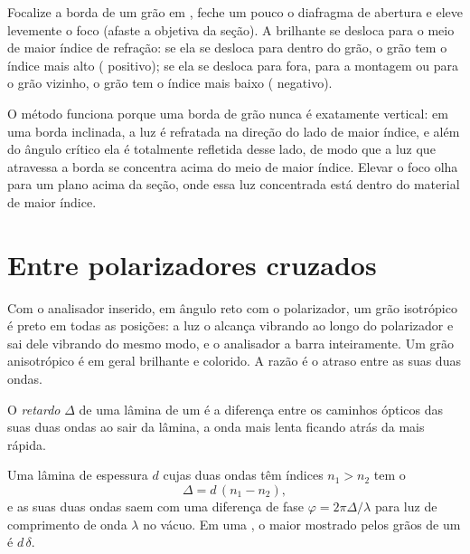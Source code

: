 \begin{method}\label{met:b1:optical-mineralogy:becke}
Focalize a borda de um grão em , feche um pouco o diafragma de abertura e eleve levemente o foco (afaste a objetiva da seção). A  brilhante se desloca para o meio de maior índice de refração: se ela se desloca para dentro do grão, o grão tem o índice mais alto ( positivo); se ela se desloca para fora, para a montagem ou para o grão vizinho, o grão tem o índice mais baixo ( negativo).
\end{method}

O método funciona porque uma borda de grão nunca é exatamente vertical: em uma borda inclinada, a luz é refratada na direção do lado de maior índice, e além do ângulo crítico ela é totalmente refletida desse lado, de modo que a luz que atravessa a borda se concentra acima do meio de maior índice. Elevar o foco olha para um plano acima da seção, onde essa luz concentrada está dentro do material de maior índice.

\section{Entre polarizadores cruzados}

Com o analisador inserido, em ângulo reto com o polarizador, um grão isotrópico é preto em todas as posições: a luz o alcança vibrando ao longo do polarizador e sai dele vibrando do mesmo modo, e o analisador a barra inteiramente. Um grão anisotrópico é em geral brilhante e colorido. A razão é o atraso entre as suas duas ondas.

\begin{definition}\label{def:b1:optical-mineralogy:retardation}
O \emph{retardo} $\Delta$ de uma lâmina de um  é a diferença entre os caminhos ópticos das suas duas ondas ao sair da lâmina, a onda mais lenta ficando atrás da mais rápida.
\end{definition}

\begin{proposition}\label{prop:b1:optical-mineralogy:retardation}
Uma lâmina de espessura $d$ cujas duas ondas têm índices $n_1 > n_2$ tem o 
\[
  \Delta = d\,(n_1 - n_2),
\]
e as suas duas ondas saem com uma diferença de fase $\varphi = 2\pi\Delta/\lambda$ para luz de comprimento de onda $\lambda$ no vácuo. Em uma , o maior  mostrado pelos grãos de um  é $d\,\delta$.
\end{proposition}

